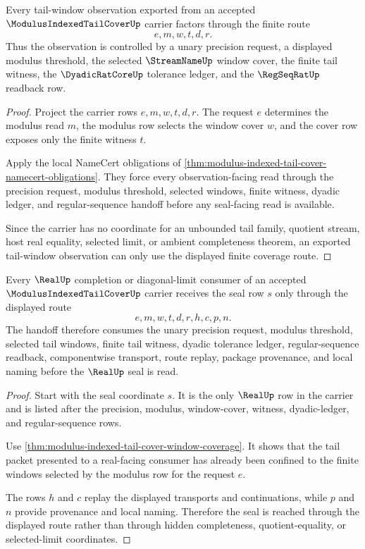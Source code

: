 \begin{theorem}
\label{thm:modulus-indexed-tail-cover-window-coverage}
Every tail-window observation exported from an accepted $\ModulusIndexedTailCoverUp$ carrier factors through the finite route
$$
e,m,w,t,d,r.
$$
Thus the observation is controlled by a unary precision request, a displayed modulus threshold, the selected $\StreamNameUp$ window cover, the finite tail witness, the $\DyadicRatCoreUp$ tolerance ledger, and the $\RegSeqRatUp$ readback row.
\end{theorem}
\begin{proof}
Project the carrier rows $e,m,w,t,d,r$. The request $e$ determines the modulus read $m$, the modulus row selects the window cover $w$, and the cover row exposes only the finite witness $t$.

Apply the local NameCert obligations of \autoref{thm:modulus-indexed-tail-cover-namecert-obligations}. They force every observation-facing read through the precision request, modulus threshold, selected windows, finite witness, dyadic ledger, and regular-sequence handoff before any seal-facing read is available.

Since the carrier has no coordinate for an unbounded tail family, quotient stream, host real equality, selected limit, or ambient completeness theorem, an exported tail-window observation can only use the displayed finite coverage route.
\end{proof}

\begin{theorem}
\label{thm:modulus-indexed-tail-cover-real-seal-handoff}
Every $\RealUp$ completion or diagonal-limit consumer of an accepted $\ModulusIndexedTailCoverUp$ carrier receives the seal row $s$ only through the displayed route
$$
e,m,w,t,d,r,h,c,p,n.
$$
The handoff therefore consumes the unary precision request, modulus threshold, selected tail windows, finite tail witness, dyadic tolerance ledger, regular-sequence readback, componentwise transport, route replay, package provenance, and local naming before the $\RealUp$ seal is read.
\end{theorem}
\begin{proof}
Start with the seal coordinate $s$. It is the only $\RealUp$ row in the carrier and is listed after the precision, modulus, window-cover, witness, dyadic-ledger, and regular-sequence rows.

Use \autoref{thm:modulus-indexed-tail-cover-window-coverage}. It shows that the tail packet presented to a real-facing consumer has already been confined to the finite windows selected by the modulus row for the request $e$.

The rows $h$ and $c$ replay the displayed transports and continuations, while $p$ and $n$ provide provenance and local naming. Therefore the seal is reached through the displayed route rather than through hidden completeness, quotient-equality, or selected-limit coordinates.
\end{proof}


